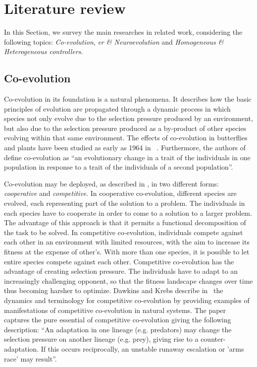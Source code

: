 \documentclass[conference]{IEEEtran}
\begin{document}
\section{Literature review}
\label{sec:lit_review}
In this Section, we survey the main researches in related work, considering the following topics: \textit{Co-evolution}, \textit{\acrlong{er} \& Neuroevolution} and \textit{Homogeneous \& Heterogeneous controllers}.
 
\subsection{Co-evolution}
Co-evolution in its foundation is a natural phenomena.
It describes how the basic principles of evolution are propagated through a dynamic process in which species not only evolve due to the selection pressure produced by an environment, but also due to the selection pressure produced as a by-product of other species evolving within that same environment.
The effects of co-evolution in butterflies and plants have been studied as early as 1964 in ~\cite{ehrlich1964butterflies}.
Furthermore, the authors of ~\cite{janzen1980coevolution} define co-evolution as ``an evolutionary change in a trait of the individuals in one population in response to a trait of the individuals of a second population''. 

Co-evolution may be deployed, as described in \cite{eiben2003introduction}, in two different forms: \textit{cooperative} and \textit{competitive}.
In cooperative co-evolution, different species are evolved, each representing part of the solution to a problem.
The individuals in each species have to cooperate in order to come to a solution to a larger problem.
The advantage of this approach is that it permits a functional decomposition of the task to be solved.
In competitive co-evolution, individuals compete against each other in an environment with limited resources, with the aim to increase its fitness at the expense of other's.
With more than one species, it is possible to let entire species compete against each other.
Competitive co-evolution has the advantage of creating selection pressure.
The individuals have to adapt to an increasingly challenging opponent, so that the fitness landscape changes over time thus becoming harsher to optimize.
Dawkins and Krebs describe in~\cite{dawkins1979arms} the dynamics and terminology for competitive co-evolution by providing examples of manifestations of competitive co-evolution in natural systems. 
The paper captures the pure essential of competitive co-evolution giving the following description: ``An adaptation in one lineage (e.g. predators) may change the selection pressure on another lineage (e.g. prey), giving rise to a counter-adaptation. If this occurs reciprocally, an unstable runaway escalation or 'arms race' may result''.
\end{document}
